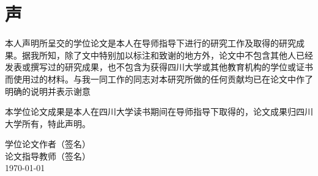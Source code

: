 
\chapter*{声}


本人声明所呈交的学位论文是本人在导师指导下进行的研究工作及取得的研究成果。据我所知，除了文中特别加以标注和致谢的地方外，论文中不包含其他人已经发表或撰写过的研究成果，也不包含为获得四川大学或其他教育机构的学位或证书而使用过的材料。与我一同工作的同志对本研究所做的任何贡献均已在论文中作了明确的说明并表示谢意

本学位论文成果是本人在四川大学读书期间在导师指导下取得的，论文成果归四川大学所有，特此声明。\par
\vspace{60pt}
\begin{flushright}
学位论文作者（签名）\CJKunderline{\hspace*{1.5in}}\\[24pt]
论文指导教师（签名）\CJKunderline{\hspace*{1.5in}}\\[24pt]
\today
\end{flushright}


